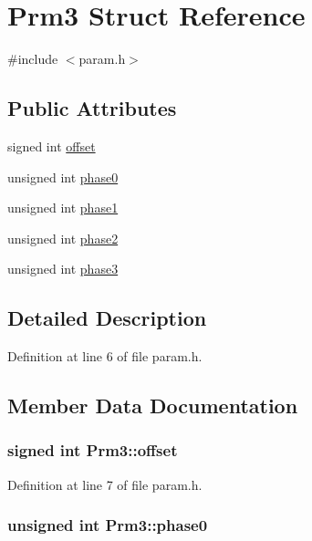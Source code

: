 \hypertarget{structPrm3}{
\section{Prm3 Struct Reference}
\label{structPrm3}
}


{\ttfamily \#include $<$param.h$>$}\subsection*{Public Attributes}
\begin{DoxyCompactItemize}
\item 
signed int \hyperlink{structPrm3_a95f8107bdd47a21631e8081d4d0d299c}{offset}
\item 
unsigned int \hyperlink{structPrm3_aeb41ff606348a6a2fb810b1acc89974c}{phase0}
\item 
unsigned int \hyperlink{structPrm3_a333c4dbf66ede0a45ef51c0e30583c02}{phase1}
\item 
unsigned int \hyperlink{structPrm3_a758633b7ce6f29cf62d39338d58696a2}{phase2}
\item 
unsigned int \hyperlink{structPrm3_aac88bf16a9706b0975457f2c0a7ced63}{phase3}
\end{DoxyCompactItemize}


\subsection{Detailed Description}


Definition at line 6 of file param.h.

\subsection{Member Data Documentation}
\hypertarget{structPrm3_a95f8107bdd47a21631e8081d4d0d299c}{
\subsubsection[{offset}]{\setlength{\rightskip}{0pt plus 5cm}signed int {\bf Prm3::offset}}}
\label{structPrm3_a95f8107bdd47a21631e8081d4d0d299c}


Definition at line 7 of file param.h.\hypertarget{structPrm3_aeb41ff606348a6a2fb810b1acc89974c}{
\subsubsection[{phase0}]{\setlength{\rightskip}{0pt plus 5cm}unsigned int {\bf Prm3::phase0}}}
\label{structPrm3_aeb41ff606348a6a2fb810b1acc89974c}


